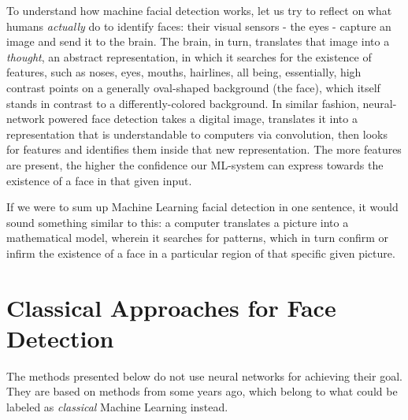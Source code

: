 To understand how machine facial detection works, let us try to reflect on what humans \textit{actually} do to identify faces: their visual sensors - the eyes - capture an image and send it to the brain. The brain, in turn, translates that image into a \textit{thought}, an abstract representation, in which it searches for the existence of features, such as noses, eyes, mouths, hairlines, all being, essentially, high contrast points on a generally oval-shaped background (the face), which itself stands in contrast to a differently-colored background. In similar fashion, neural-network powered face detection takes a digital image, translates it into a representation that is understandable to computers via convolution, then looks for features and identifies them inside that new representation. The more features are present, the higher the confidence our ML-system can express towards the existence of a face in that given input. \par
If we were to sum up Machine Learning facial detection in one sentence, it would sound something similar to this: a computer translates a picture into a mathematical model, wherein it searches for patterns, which in turn confirm or infirm the existence of a face in a particular region of that specific given picture. \par

\section{Classical Approaches for Face Detection} 
The methods presented below do not use neural networks for achieving their goal. They are based on methods from some years ago, which belong to what could be labeled as \textit{classical} Machine Learning instead. \cite{classic_ml_quora}
